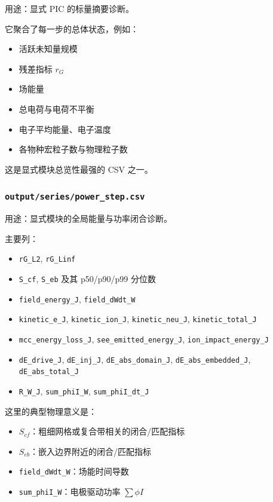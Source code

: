 \documentclass[11pt,a4paper]{ctexart}
\newcommand{\code}[1]{\texttt{#1}}
\newcommand{\file}[1]{\texttt{#1}}
\newcommand{\sym}[1]{\ensuremath{#1}}
\begin{document}
用途：显式 PIC 的标量摘要诊断。

它聚合了每一步的总体状态，例如：

\begin{itemize}
  \item 活跃未知量规模
  \item 残差指标 \sym{r_G}
  \item 场能量
  \item 总电荷与电荷不平衡
  \item 电子平均能量、电子温度
  \item 各物种宏粒子数与物理粒子数
\end{itemize}

这是显式模块总览性最强的 CSV 之一。

\subsubsection{\file{output/series/power\_step.csv}}

用途：显式模块的全局能量与功率闭合诊断。

主要列：

\begin{itemize}
  \item \code{rG\_L2}, \code{rG\_Linf}
  \item \code{S\_cf}, \code{S\_eb} 及其 p50/p90/p99 分位数
  \item \code{field\_energy\_J}, \code{field\_dWdt\_W}
  \item \code{kinetic\_e\_J}, \code{kinetic\_ion\_J}, \code{kinetic\_neu\_J}, \code{kinetic\_total\_J}
  \item \code{mcc\_energy\_loss\_J}, \code{see\_emitted\_energy\_J}, \code{ion\_impact\_energy\_J}
  \item \code{dE\_drive\_J}, \code{dE\_inj\_J}, \code{dE\_abs\_domain\_J}, \code{dE\_abs\_embedded\_J}, \code{dE\_abs\_total\_J}
  \item \code{R\_W\_J}, \code{sum\_phiI\_W}, \code{sum\_phiI\_dt\_J}
\end{itemize}

这里的典型物理意义是：

\begin{itemize}
  \item \sym{S_{cf}}：粗细网格或复合带相关的闭合/匹配指标
  \item \sym{S_{eb}}：嵌入边界附近的闭合/匹配指标
  \item \code{field\_dWdt\_W}：场能时间导数
  \item \code{sum\_phiI\_W}：电极驱动功率 \sym{\sum \phi I}
\end{itemize}
\end{document}
